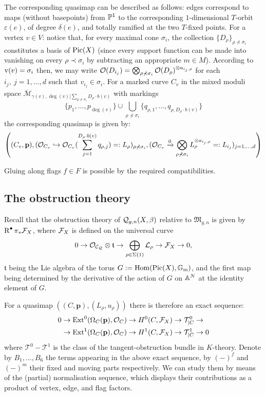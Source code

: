 The corresponding quasimap can be described as follows: edges correspond to maps (without basepoints) from $\mathbb P^1$ to the corresponding $1$-dimensional $T$-orbit $\varepsilon(e)$, of degree $\delta(e)$, and totally ramified at the two $T$-fixed points. For a vertex $v\in V$: notice that, for every maximal cone $\sigma_i$, the collection $\{D_\rho\}_{\rho\nprec\sigma_i}$ constitutes a basis of $\operatorname{Pic}(X)$ (since every support function can be made into vanishing on every $\rho\prec\sigma_i$ by subtracting an appropriate $m\in M$). According to $\operatorname{v}(v)=\sigma_i$ then, we may write $\mathcal{O}(D_{i_j})=\bigotimes_{\rho\nprec\sigma_i} \mathcal{O}(D_\rho)^{\otimes a_{i_j,\rho}}$ for each $i_j,\ j=1,\ldots,d$ such that $v_{i_j}\in \sigma_i$. For a marked curve $C_v$ in the mixed moduli space $\overline{\mathcal M}_{\gamma(v),\deg(v)|\sum_{\rho\nprec \sigma_i}D_\rho\cdot b(v)}$ with markings
\[
 \{p_1,\ldots,p_{\deg(v)}\}\cup\bigcup_{\rho\nprec\sigma_i}\{q_{\rho,1},\ldots,q_{\rho,D_{\rho}\cdot b(v)}\}
\]
the corresponding quasimap is given by:
\[
 \left((C_v,\mathbf p),(\mathcal O_{C_v}\hookrightarrow\mathcal{O}_{C_v}(\sum_{j=1}^{D_{\rho}\cdot b(v) }q_{\rho,j})=:L_\rho)_{\rho\nprec\sigma_i},(\mathcal O_{C_v}\xrightarrow{0}\bigotimes_{\rho\nprec\sigma_i} L_\rho^{\otimes a_{i_j,\rho}}=:L_{i_j})_{j=1,\ldots,d} \right)
\]

Gluing along flags $f\in F$ is possible by the required compatibilities.

\subsection{The obstruction theory} Recall that the obstruction theory of $\mathcal{Q}_{g,n}(X,\beta)$ relative to $\mathfrak M_{g,n}$ is given by $\operatorname{R}^{\bullet}\pi_*\mathcal F_X$, where $\mathcal F_X$ is defined on the universal curve
\begin{equation}\label{eqn:F}
 0\rightarrow\mathcal{O}_{\mathcal C_\mathcal Q}\otimes \mathfrak t\rightarrow\bigoplus_{\rho\in\Sigma(1)}\mathcal L_\rho\rightarrow\mathcal F_X\rightarrow 0,
\end{equation}
$\mathfrak t$ being the Lie algebra of the torus $G:=\operatorname{Hom}(\operatorname{Pic}(X),\mathbb{G}_{\text{m}})$, and the first map being determined by the derivative of the action of $G$ on $\mathbb{A}^N$ at the identity element of $G$.

For a quasimap $\left((C,\mathbf p),(L_{\rho},u_{\rho})\right)$ there is therefore an exact sequence:
\begin{align*}
 0&\rightarrow \operatorname{Ext}^0(\Omega_C(\mathbf p),\mathcal{O}_C)\rightarrow H^0(C,\mathcal F_X)\rightarrow \mathcal T^0_{|C}\rightarrow \\
  &\rightarrow \operatorname{Ext}^1(\Omega_C(\mathbf p),\mathcal{O}_C)\rightarrow H^1(C,\mathcal F_X)\rightarrow \mathcal T^1_{|C}\rightarrow 0
\end{align*}
where $\mathcal T^0-\mathcal T^1$ is the class of the tangent-obstruction bundle in $K$-theory.
Denote by $B_1,\ldots, B_6$ the terms appearing in the above exact sequence, by $(-)^f$ and $(-)^m$ their fixed and moving parts respectively. We can study them by means of the (partial) normalisation sequence, which displays their contributions as a product of vertex, edge, and flag factors.

